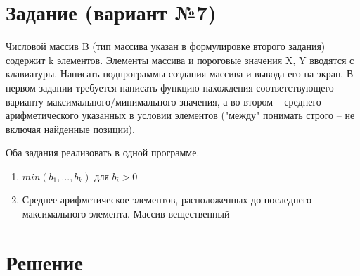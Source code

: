 \documentclass[12pt]{article}
\begin{document}
\section*{Задание (вариант №7)}
Числовой массив B (тип массива указан в формулировке второго задания) содержит k элементов. Элементы массива и пороговые
значения X, Y вводятся с клавиатуры. Написать подпрограммы создания массива и вывода его на экран. В первом задании
требуется написать функцию нахождения соответствующего варианту максимального/минимального значения, а во втором –
среднего арифметического указанных в условии элементов ("между" понимать строго – не включая найденные позиции). 

Оба задания реализовать в одной программе.
\begin{enumerate}
\item $min(b_{1}, ..., b_{k})$ для $b_{i}>0$
\item Среднее арифметическое элементов, расположенных до последнего максимального элемента. Массив вещественный
\end{enumerate}


\newpage


\section*{Решение}

\end{document}
